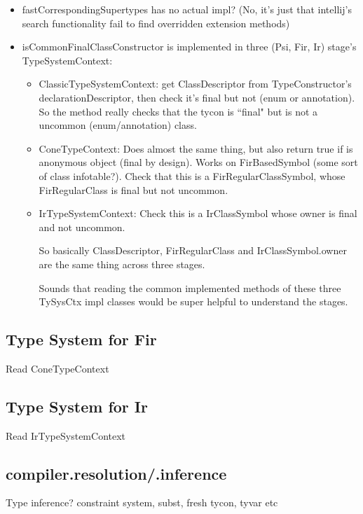 \documentclass{article}
\begin{document}
\begin{itemize}
    \item fastCorrespondingSupertypes has no actual impl? (No, it's just that intellij's search functionality fail to find overridden extension methods)
    \item isCommonFinalClassConstructor is implemented in three (Psi, Fir, Ir) stage's TypeSystemContext:
    \begin{itemize}
        \item ClassicTypeSystemContext: get ClassDescriptor from TypeConstructor's declarationDescriptor, then check it's final but not (enum or annotation). So the method really checks that the tycon is ``final" but is not a uncommon (enum/annotation) class.
        \item ConeTypeContext: Does almost the same thing, but also return true if is anonymous object (final by design). Works on FirBasedSymbol (some sort of class infotable?). Check that this is a FirRegularClassSymbol, whose FirRegularClass is final but not uncommon.
        \item IrTypeSystemContext: Check this is a IrClassSymbol whose owner is final and not uncommon.

        So basically ClassDescriptor, FirRegularClass and IrClassSymbol.owner are the same thing across three stages.

        Sounds that reading the common implemented methods of these three TySysCtx impl classes would be super helpful to understand the stages.
    \end{itemize}
\end{itemize}

\subsection{Type System for Fir}

Read ConeTypeContext

\subsection{Type System for Ir}

Read IrTypeSystemContext

\subsection{compiler.resolution/.inference}

Type inference? constraint system, subst, fresh tycon, tyvar etc
\end{document}
